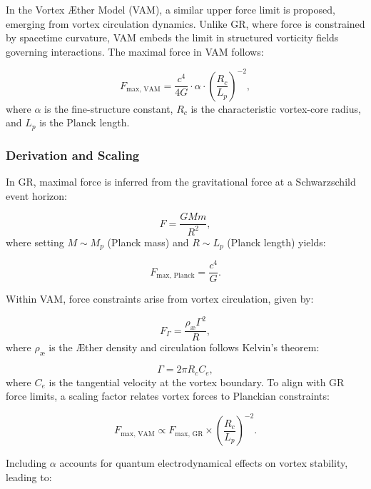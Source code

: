 In the Vortex \AE ther Model (VAM), a similar upper force limit is proposed, emerging from vortex circulation dynamics. Unlike GR, where force is constrained by spacetime curvature, VAM embeds the limit in structured vorticity fields governing interactions. The maximal force in VAM follows:


\begin{equation*}
    F_{\text{max, VAM}} = \frac{c^4}{4G} \cdot \alpha \cdot \left(\frac{R_c}{L_p}\right)^{-2},
\end{equation*}
where $\alpha$ is the fine-structure constant, $R_c$ is the characteristic vortex-core radius, and $L_p$ is the Planck length.


\subsubsection*{Derivation and Scaling}
In GR, maximal force is inferred from the gravitational force at a Schwarzschild event horizon:


\begin{equation*}
    F = \frac{GMm}{R^2},
\end{equation*}
where setting $M \sim M_p$ (Planck mass) and $R \sim L_p$ (Planck length) yields:


\begin{equation*}
    F_{\text{max, Planck}} = \frac{c^4}{G}.
\end{equation*}


Within VAM, force constraints arise from vortex circulation, given by:


\begin{equation*}
    F_{\Gamma} = \frac{\rho_{\text{\ae}} \Gamma^2}{R},
\end{equation*}
where $\rho_{\text{\ae}}$ is the \AE ther density and circulation follows Kelvin’s theorem:


\begin{equation*}
    \Gamma = 2\pi R_c C_e,
\end{equation*}
where $C_e$ is the tangential velocity at the vortex boundary. To align with GR force limits, a scaling factor relates vortex forces to Planckian constraints:


\begin{equation*}
    F_{\text{max, VAM}} \propto F_{\text{max, GR}} \times \left(\frac{R_c}{L_p}\right)^{-2}.
\end{equation*}


Including $\alpha$ accounts for quantum electrodynamical effects on vortex stability, leading to:


